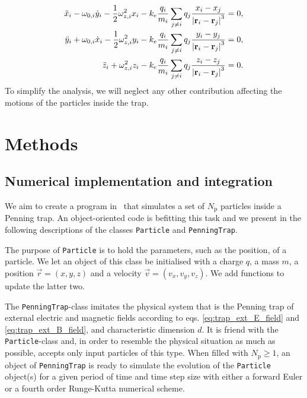 \begin{subequations}\label{eq:p4_diffeq_many_particles_xyz}
    \begin{align}
        \ddot{x}_i - \omega_{0,i} \dot{y}_i - \frac{1}{2}\omega_{z,i}^2 x_i - k_e \frac{q_i}{m_i} \sum_{j\neq i} q_j \frac{x_i - x_j}{\abs{\mathbf{r}_i - \mathbf{r}_j}^3} =0, \label{eq:p4_diffeq_many_particles_x} \\
        \ddot{y}_i + \omega_{0,i} \dot{x}_i - \frac{1}{2}\omega_{z,i}^2 y_i - k_e \frac{q_i}{m_i} \sum_{j\neq i} q_j \frac{y_i - y_j}{\abs{\mathbf{r}_i - \mathbf{r}_j}^3} =0, \label{eq:p4_diffeq_many_particles_y} \\ 
        \ddot{z}_i + \omega_{z,i}^2 z_i - k_e \frac{q_i}{m_i} \sum_{j\neq i} q_j \frac{z_i - z_j}{\abs{\mathbf{r}_i - \mathbf{r}_j}^3} =0. \label{eq:p4_diffeq_many_particles_z}
    \end{align}
\end{subequations}
To simplify the analysis, we will neglect any other contribution affecting the motions of the particles inside the trap. 

\section{Methods}\label{sec:methods}


\subsection{ Numerical implementation and integration }\label{sec:code}

We aim to create a program in \CC\, that simulates a set of $N_\mathrm{p}$ particles inside a Penning trap. An object-oriented code is befitting this task and we present in the following descriptions of the classes \verb|Particle| and \verb|PenningTrap|.

The purpose of \texttt{Particle} is to hold the parameters, such as the position, of a particle. We let an object of this class be initialised with a charge $q$, a mass $m$, a position $\vec{r} = (x,y,z)$ and a velocity $\vec{v} = (v_x, v_y, v_z)$. We add functions to update the latter two. 

The \texttt{PenningTrap}-class imitates the physical system that is the Penning trap of external electric and magnetic fields according to eqs. \eqref{eq:trap_ext_E_field} and \eqref{eq:trap_ext_B_field}, and characteristic dimension $d$. It is friend with the \texttt{Particle}-class and, in order to resemble the physical situation as much as possible, accepts only input particles of this type. When filled with $N_\mathrm{p}\geq 1$, an object of \texttt{PenningTrap} is ready to simulate the evolution of the \texttt{Particle} object(s) for a given period of time and time step size with either a forward Euler or a fourth order Runge-Kutta numerical scheme. 

